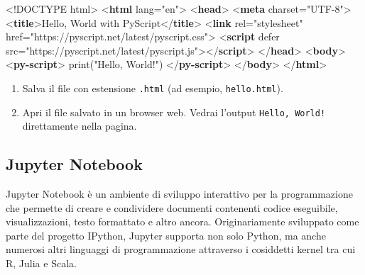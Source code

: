 \documentclass[
  letterpaper,
]{scrbook}
\newenvironment{Shaded}{\begin{snugshade}}{\end{snugshade}}
\newcommand{\DataTypeTok}[1]{\textcolor[rgb]{0.68,0.00,0.00}{#1}}
\newcommand{\KeywordTok}[1]{\textcolor[rgb]{0.00,0.23,0.31}{\textbf{#1}}}
\newcommand{\NormalTok}[1]{\textcolor[rgb]{0.00,0.23,0.31}{#1}}
\newcommand{\OperatorTok}[1]{\textcolor[rgb]{0.37,0.37,0.37}{#1}}
\newcommand{\OtherTok}[1]{\textcolor[rgb]{0.00,0.23,0.31}{#1}}
\newcommand{\StringTok}[1]{\textcolor[rgb]{0.13,0.47,0.30}{#1}}
\providecommand{\tightlist}{%
  \setlength{\itemsep}{0pt}\setlength{\parskip}{0pt}}\usepackage{longtable,booktabs,array}
\begin{document}
\begin{Shaded}
\begin{Highlighting}[]
\DataTypeTok{\textless{}!DOCTYPE}\NormalTok{ html}\DataTypeTok{\textgreater{}}
\DataTypeTok{\textless{}}\KeywordTok{html}\OtherTok{ lang}\OperatorTok{=}\StringTok{"en"}\DataTypeTok{\textgreater{}}
\DataTypeTok{\textless{}}\KeywordTok{head}\DataTypeTok{\textgreater{}}
    \DataTypeTok{\textless{}}\KeywordTok{meta}\OtherTok{ charset}\OperatorTok{=}\StringTok{"UTF{-}8"}\DataTypeTok{\textgreater{}}
    \DataTypeTok{\textless{}}\KeywordTok{title}\DataTypeTok{\textgreater{}}\NormalTok{Hello, World with PyScript}\DataTypeTok{\textless{}/}\KeywordTok{title}\DataTypeTok{\textgreater{}}
    \DataTypeTok{\textless{}}\KeywordTok{link}\OtherTok{ rel}\OperatorTok{=}\StringTok{"stylesheet"}\OtherTok{ href}\OperatorTok{=}\StringTok{"https://pyscript.net/latest/pyscript.css"}\DataTypeTok{\textgreater{}}
    \DataTypeTok{\textless{}}\KeywordTok{script}\OtherTok{ defer src}\OperatorTok{=}\StringTok{"https://pyscript.net/latest/pyscript.js"}\DataTypeTok{\textgreater{}\textless{}/}\KeywordTok{script}\DataTypeTok{\textgreater{}}
\DataTypeTok{\textless{}/}\KeywordTok{head}\DataTypeTok{\textgreater{}}
\DataTypeTok{\textless{}}\KeywordTok{body}\DataTypeTok{\textgreater{}}
    \DataTypeTok{\textless{}}\KeywordTok{py{-}script}\DataTypeTok{\textgreater{}}
\NormalTok{        print("Hello, World!")}
    \DataTypeTok{\textless{}/}\KeywordTok{py{-}script}\DataTypeTok{\textgreater{}}
\DataTypeTok{\textless{}/}\KeywordTok{body}\DataTypeTok{\textgreater{}}
\DataTypeTok{\textless{}/}\KeywordTok{html}\DataTypeTok{\textgreater{}}
\end{Highlighting}
\end{Shaded}

\begin{enumerate}
\def\labelenumi{\arabic{enumi}.}
\setcounter{enumi}{2}
\tightlist
\item
  Salva il file con estensione \texttt{.html} (ad esempio,
  \texttt{hello.html}).
\item
  Apri il file salvato in un browser web. Vedrai l'output
  \texttt{Hello,\ World!} direttamente nella pagina.
\end{enumerate}

\subsection{Jupyter Notebook}\label{jupyter-notebook}

Jupyter Notebook è un ambiente di sviluppo interattivo per la
programmazione che permette di creare e condividere documenti contenenti
codice eseguibile, visualizzazioni, testo formattato e altro ancora.
Originariamente sviluppato come parte del progetto IPython, Jupyter
supporta non solo Python, ma anche numerosi altri linguaggi di
programmazione attraverso i cosiddetti kernel tra cui R, Julia e Scala.
\end{document}
